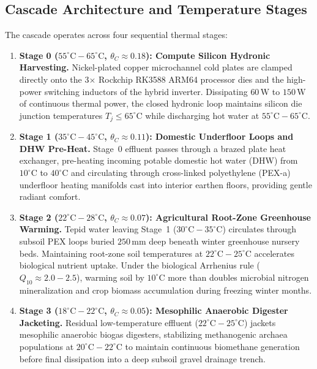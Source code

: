 \subsection{Cascade Architecture and Temperature Stages}
The cascade operates across four sequential thermal stages:
\begin{enumerate}
    \item \textbf{Stage 0 ($55^\circ\mathrm{C}-65^\circ\mathrm{C}$, $\theta_C \approx 0.18$): Compute Silicon Hydronic Harvesting.}
    Nickel-plated copper microchannel cold plates are clamped directly onto the 3$\times$ Rockchip RK3588 ARM64 processor dies and the high-power switching inductors of the hybrid inverter. Dissipating $60\,\mathrm{W}$ to $150\,\mathrm{W}$ of continuous thermal power, the closed hydronic loop maintains silicon die junction temperatures $T_j \le 65^\circ\mathrm{C}$ while discharging hot water at $55^\circ\mathrm{C}-65^\circ\mathrm{C}$.
    
    \item \textbf{Stage 1 ($35^\circ\mathrm{C}-45^\circ\mathrm{C}$, $\theta_C \approx 0.11$): Domestic Underfloor Loops and DHW Pre-Heat.}
    Stage~0 effluent passes through a brazed plate heat exchanger, pre-heating incoming potable domestic hot water (DHW) from $10^\circ\mathrm{C}$ to $40^\circ\mathrm{C}$ and circulating through cross-linked polyethylene (PEX-a) underfloor heating manifolds cast into interior earthen floors, providing gentle radiant comfort.
    
    \item \textbf{Stage 2 ($22^\circ\mathrm{C}-28^\circ\mathrm{C}$, $\theta_C \approx 0.07$): Agricultural Root-Zone Greenhouse Warming.}
    Tepid water leaving Stage~1 ($30^\circ\mathrm{C}-35^\circ\mathrm{C}$) circulates through subsoil PEX loops buried $250\,\mathrm{mm}$ deep beneath winter greenhouse nursery beds. Maintaining root-zone soil temperatures at $22^\circ\mathrm{C}-25^\circ\mathrm{C}$ accelerates biological nutrient uptake. Under the biological Arrhenius rule ($Q_{10} \approx 2.0 - 2.5$), warming soil by $10^\circ\mathrm{C}$ more than doubles microbial nitrogen mineralization and crop biomass accumulation during freezing winter months.
    
    \item \textbf{Stage 3 ($18^\circ\mathrm{C}-22^\circ\mathrm{C}$, $\theta_C \approx 0.05$): Mesophilic Anaerobic Digester Jacketing.}
    Residual low-temperature effluent ($22^\circ\mathrm{C}-25^\circ\mathrm{C}$) jackets mesophilic anaerobic biogas digesters, stabilizing methanogenic archaea populations at $20^\circ\mathrm{C}-22^\circ\mathrm{C}$ to maintain continuous biomethane generation before final dissipation into a deep subsoil gravel drainage trench.
\end{enumerate}

